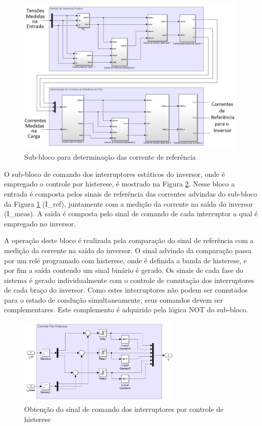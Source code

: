\begin{figure}[!htb] %
	\centering
	\includegraphics[width=0.99\textwidth]{Cap4/Figuras/controlador.png}
	\caption{Sub-bloco para determinação das corrente de referência}
	\label{fig:controladador.png}
\end{figure}

O sub-bloco de comando dos interruptores estáticos do inversor, onde é empregado o controle por histerese, é mostrado na Figura \ref{fig:histerese_sim.png}. Nesse bloco a entrada é composta pelos sinais de referência das correntes advindas do sub-bloco da Figura \ref{fig:controladador.png} (I\_ref), juntamente com a medição da corrente na saída do inversor (I\_meas). A saída é composta pelo sinal de comando de cada interruptor a qual é empregado no inversor.

A operação deste bloco é realizada pela comparação do sinal de referência com a medição da corrente na saída do inversor. O sinal advindo da comparação passa por um relé programado com histerese, onde é definida a banda de histerese, e por fim a saída contendo um sinal binário é gerado. Os sinais de cada fase do sistema é gerado individualmente com o controle de comutação dos interruptores de cada braço do inversor. Como estes interruptores não podem ser comutados para o estado de condução simultaneamente, seus comandos devem ser complementares. Este complemento é adquirido pela lógica NOT do sub-bloco.

\begin{figure}[!htb] %
	\centering
	\includegraphics[width=0.7\textwidth]{Cap4/Figuras/histerese_sim.png}
	\caption{Obtenção do sinal de comando dos interruptores por controle de histerese}
	\label{fig:histerese_sim.png}
\end{figure}


